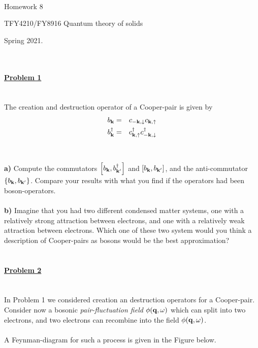 \documentclass{article}
\begin{document}
\\

\centerline{\Large Homework 8}
\centerline{\Large  TFY4210/FY8916 Quantum theory of solids}
\centerline{\Large Spring 2021.}
\normalsize
\ \\
\ \\
\underline{\large\bf Problem 1 }\\
\ \\
\ \\
The creation and destruction operator of a Cooper-pair is given by 
\begin{eqnarray}
b_{\bf k} & =  & c_{-{\bf k}, \downarrow} c_{{\bf k}, \uparrow} \nonumber \\  
b^{\dagger}_{\bf k} & =  & c^{\dagger}_{{\bf k}, \uparrow} c^{\dagger}_{-{\bf k}, \downarrow} \nonumber  
\end{eqnarray}
\ \\
\ \\
{\bf a) } Compute the commutators $\left[ b_{\bf k}, b^{\dagger}_{{\bf k}^{\prime}} \right]$  and 
$\left[ b_{\bf k}, b_{{\bf k}^{\prime}} \right]$, and the anti-commutator  $\left\{ b_{\bf k}, b_{{\bf k}^{\prime}} \right\}$. 
Compare your results with what you find if the operators had been boson-operators. 
\ \\
\ \\
{\bf b)} Imagine that you had two different condensed matter systems, one with a relatively strong attraction between electrons, and one with a relatively weak attraction between electrons.  Which one of these two system would you think a description of Cooper-pairs as bosons would be the best approximation?  
\ \\
\ \\
\ \\
\underline{\large\bf Problem 2 }\\
\ \\
\ \\
In Problem 1 we considered creation an destruction operators for a Cooper-pair. Consider now a bosonic {\it pair-fluctuation field} $\phi({\bf q}, \omega)$ which can split into two electrons, and two electrons can recombine into the field $\phi({\bf q}, \omega)$. 
\ \\
\ \\
A Feynman-diagram for such a process is given in the Figure below. 
\ \\
\ \\
\end{document}
